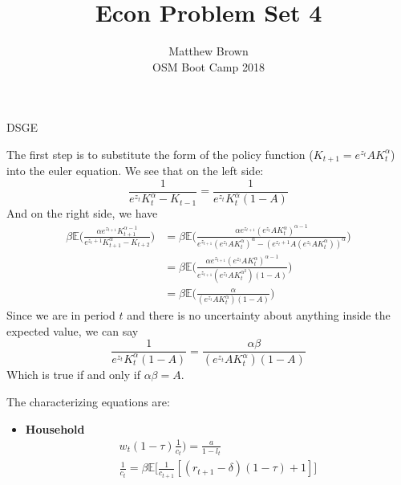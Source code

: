 \documentclass[12pt]{article}
\newenvironment{problem}[2][Problem]{\begin{trivlist}
\item[\hskip \labelsep {\bfseries #1}\hskip \labelsep {\bfseries #2.}]}{\end{trivlist}}
\theoremstyle{definition}
\theoremstyle{definition}
\theoremstyle{definition}
\theoremstyle{definition}
\begin{document}
\title{Econ Problem Set 4}
\author{Matthew Brown\\ 
OSM Boot Camp 2018} %
 
\maketitle
 
\begin{section}{DSGE}
\begin{problem}{1}
The first step is to substitute the form of the policy function ($K_{t+1} = e^{z_t}AK_{t}^\alpha$) into the euler equation. We see that on the left side:
\begin{equation}
\frac{1}{e^{z_t}K_t^\alpha - K_{t-1}} = \frac{1}{e^{z_t}K_t^\alpha(1- A)}
\end{equation}
And on the right side, we have
\begin{align}
\beta \mathbb{E} \Big( \frac{\alpha e^{z_{t+1}} K_{t+1}^{\alpha - 1}}{e^{z_t+1} K_{t+1}^\alpha - K_{t+2}} \Big) &= \beta \mathbb{E} \Big( \frac{\alpha e^{z_{t+1}} (e^{z_t}AK_{t}^\alpha)^{\alpha - 1}}{e^{z_{t+1}} (e^{z_t}AK_{t}^\alpha)^\alpha - (e^{z_t+1}A(e^{z_t}AK_{t}^\alpha))^\alpha} \Big) \\ 
&= \beta \mathbb{E} \Big( \frac{\alpha e^{z_{t+1}} (e^{z_t}AK_{t}^\alpha)^{\alpha - 1}}{e^{z_{t+1}}(e^{z_t}AK_{t}^{\alpha^2})(1 - A)} \Big) \\
&=  \beta \mathbb{E} \Big( \frac{\alpha}{ (e^{z_t}AK_{t}^\alpha)(1- A)}\Big)
\end{align}
Since we are in period $t$ and there is no uncertainty about anything inside the expected value, we can say
\begin{equation}
\frac{1}{e^{z_t}K_t^\alpha(1- A)} = \frac{\alpha \beta}{ (e^{z_t}AK_{t}^\alpha)(1- A)}
\end{equation}
Which is true if and only if $\alpha \beta = A$.
\end{problem}

\begin{problem}{2}
The characterizing equations are:
\begin{itemize}
\item \textbf{Household}
\begin{align}
w_t(1-\tau)\frac{1}{c_t}) = \frac{a}{1-l_t} \\
\frac{1}{c_t} = \beta \mathbb{E} \big[ \frac{1}{c_{t+1}}[(r_{t+1}-\delta)(1-\tau) +1] \big]
\end{align}


\end{itemize}
\end{problem}
\end{section}
\end{document}
